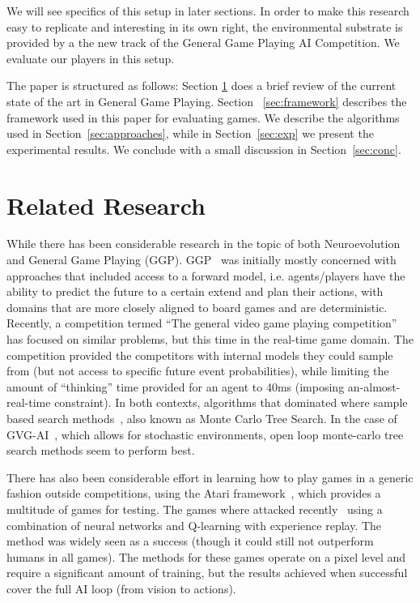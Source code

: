 \documentclass[conference]{IEEEtran}
\begin{document}
We will see specifics of this setup in later sections. In order to make this research easy to replicate and interesting in its own right, the environmental substrate is provided by a the new track of the General Game Playing AI Competition. We evaluate our players in this setup. 

The paper is structured as follows: Section \ref{sec:lit} does a brief review of the current state of the art in General Game Playing. Section ~\ref{sec:framework} describes the framework used in this paper for evaluating games. We describe the algorithms used in Section~\ref{sec:approaches}, while in Section~\ref{sec:exp} we present the experimental results. We conclude with a small discussion in Section~\ref{sec:conc}. 
 
\section{Related Research} \label{sec:lit}
While there has been considerable research in the topic of both Neuroevolution and General Game Playing (GGP). GGP~\cite{genesereth2005general} was initially mostly concerned with approaches that included access to a forward model, i.e. agents/players have the ability to predict the future to a certain extend and plan their actions, with domains that are more closely aligned to board games and are deterministic. Recently, a competition termed ``The general video game playing competition''~\cite{Perez2015} has focused on similar problems, but this time in the real-time game domain. The competition provided the competitors with internal models they could sample from (but not access to specific future event probabilities), while limiting the amount of ``thinking'' time provided for an agent to 40ms (imposing an-almost-real-time constraint). In both contexts, algorithms that dominated where sample based search methods~\cite{finnsson2008simulation, Perez2015}, also known as Monte Carlo Tree Search. In the case of GVG-AI~\cite{Perez2015}, which allows for stochastic environments, open loop monte-carlo tree search methods seem to perform best. 

There has also been considerable effort in learning how to play games in a generic fashion outside competitions,  using the Atari framework~\cite{13jair}, which provides a multitude of games for testing. The games where attacked recently~\cite{mnih2015human} using a combination of neural networks and Q-learning with experience replay. The method was widely seen as a success (though it could still not outperform humans in all games). The methods for these games operate on a pixel level and require a significant amount of training, but the results achieved when successful cover the full AI loop (from vision to actions). 
\end{document}
